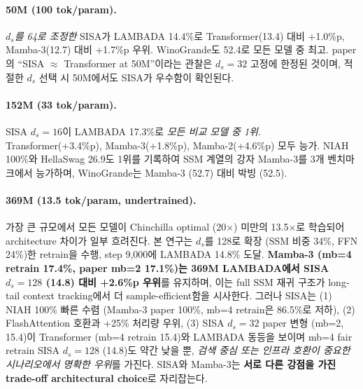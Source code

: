 \documentclass[11pt]{article}
\begin{document}
\paragraph{50M (100 tok/param).} \textit{$d_s$를 64로 조정한} SISA가 LAMBADA 14.4\%로 Transformer(13.4) 대비 +1.0\%p, Mamba-3(12.7) 대비 +1.7\%p 우위. WinoGrande도 52.4로 모든 모델 중 최고. paper의 ``SISA $\approx$ Transformer at 50M''이라는 관찰은 $d_s = 32$ 고정에 한정된 것이며, 적절한 $d_s$ 선택 시 50M에서도 SISA가 우수함이 확인된다.

\paragraph{152M (33 tok/param).} SISA $d_s = 16$이 LAMBADA 17.3\%로 \textit{모든 비교 모델 중 1위}. Transformer(+3.4\%p), Mamba-3(+1.8\%p), Mamba-2(+4.6\%p) 모두 능가. NIAH 100\%와 HellaSwag 26.9도 1위를 기록하여 SSM 계열의 강자 Mamba-3를 3개 벤치마크에서 능가하며, WinoGrande는 Mamba-3 (52.7) 대비 박빙 (52.5).

\paragraph{369M (13.5 tok/param, undertrained).} 가장 큰 규모에서 모든 모델이 Chinchilla optimal (20$\times$) 미만의 13.5$\times$로 학습되어 architecture 차이가 일부 흐려진다. 본 연구는 $d_s$를 128로 확장 (SSM 비중 34\%, FFN 24\%)한 retrain을 수행, step 9,000에 LAMBADA 14.8\% 도달. \textbf{Mamba-3 (mb=4 retrain 17.4\%, paper mb=2 17.1\%)는 369M LAMBADA에서 SISA $d_s=128$ (14.8) 대비 +2.6\%p 우위}를 유지하며, 이는 full SSM 재귀 구조가 long-tail context tracking에서 더 sample-efficient함을 시사한다. 그러나 SISA는 (1) NIAH 100\% 빠른 수렴 (Mamba-3 paper 100\%, mb=4 retrain은 86.5\%로 저하), (2) FlashAttention 호환과 +25\% 처리량 우위, (3) SISA $d_s=32$ paper 변형 (mb=2, 15.4)이 Transformer (mb=4 retrain 15.4)와 LAMBADA 동등을 보이며 mb=4 fair retrain SISA $d_s=128$ (14.8)도 약간 낮을 뿐, \textit{검색 중심 또는 인프라 호환이 중요한 시나리오에서 명확한 우위}를 가진다. SISA와 Mamba-3는 \textbf{서로 다른 강점을 가진 trade-off architectural choice}로 자리잡는다.
\end{document}
